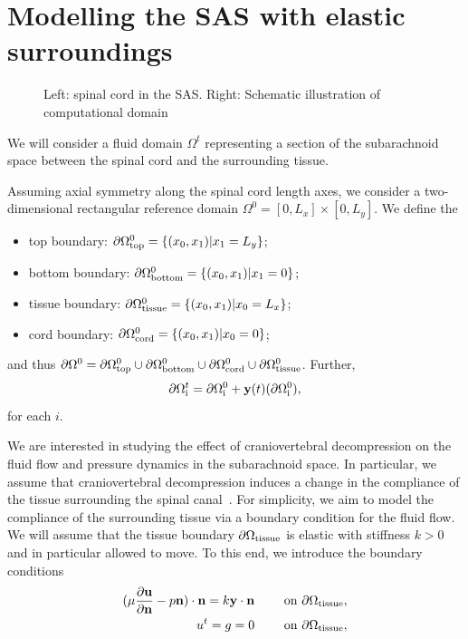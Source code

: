 \documentclass[11pt,a4paper,titlepage]{report}
\begin{document}
\section{Modelling the SAS with elastic surroundings}

\begin{figure}
  \caption{Left: spinal cord in the SAS. Right: Schematic illustration
    of computational domain}
\end{figure}

We will consider a fluid domain $\Omega^t$ representing a section of
the subarachnoid space between the spinal cord and the surrounding
tissue.

Assuming axial symmetry along the spinal cord length axes, we consider
a two-dimensional rectangular reference domain $\Omega^0 = [0, L_x]
\times [0, L_y]$. We define the
\begin{itemize}
\item
  top boundary: $\partial \Omega_{\rm top}^0 = \{ (x_0, x_1) | x_1 = L_y\}$;
\item
  bottom boundary: $\partial \Omega_{\rm bottom}^0 = \{ (x_0, x_1) | x_1 = 0\}$;
\item
  tissue boundary: $\partial \Omega_{\rm tissue}^0 = \{ (x_0, x_1) | x_0 = L_x\}$;
\item
  cord boundary: $\partial \Omega_{\rm cord}^0 = \{ (x_0, x_1) | x_0 = 0\}$;
\end{itemize}
and thus $\partial \Omega^0 = \partial \Omega_{\rm top}^0 \cup
\partial \Omega_{\rm bottom}^0 \cup \partial \Omega_{\rm cord}^0 \cup
\partial \Omega_{\rm tissue}^0$. Further,
\begin{equation}
  \partial \Omega^t_{\rm i} = \partial \Omega^0_{\rm i} + \mathbf{y}(t)(\partial \Omega^0_{\rm i}),
\end{equation}
for each $i$.

We are interested in studying the effect of craniovertebral
decompression on the fluid flow and pressure dynamics in the
subarachnoid space. In particular, we assume that craniovertebral
decompression induces a change in the compliance of the tissue
surrounding the spinal canal~\cite{}. For simplicity, we aim to model
the compliance of the surrounding tissue via a boundary condition for
the fluid flow. We will assume that the tissue boundary $\partial
\Omega_{\rm tissue}$ is elastic with stiffness $k > 0$ and in particular
allowed to move. To this end, we introduce the boundary conditions
\begin{align}
\label{eq:bc:1}
(\mu \frac{\partial \mathbf{u}}{\partial \mathbf{n}} - p \mathbf{n}) \cdot \mathbf{n} = k \mathbf{y} \cdot \mathbf{n} \qquad \text{ on } \partial \Omega_{\rm tissue},\\
\label{eq:bc:3}
u^t = g = 0 \qquad \text{ on } \partial \Omega_{\rm tissue},
\end{align}
\end{document}
